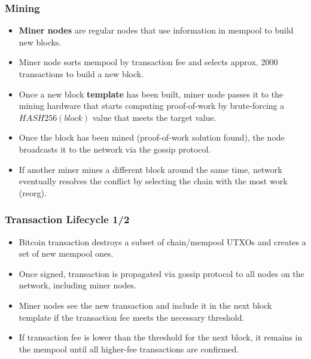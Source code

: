 \documentclass{beamer}
\begin{document}
\begin{frame}
  \frametitle{Mining}
  \begin{itemize}
  \item \textbf{Miner nodes} are regular nodes that use information in mempool
    to build new blocks.
  \item Miner node sorts mempool by transaction fee and selects approx. 2000
    transactions to build a new block.
  \item Once a new block \textbf{template} has been built, miner node passes it
    to the mining hardware that starts computing proof-of-work by brute-forcing
    a $HASH256(block)$ value that meets the target value.
  \item Once the block has been mined (proof-of-work solution found), the node
    broadcasts it to the network via the gossip protocol.
  \item If another miner mines a different block around the same time, network
    eventually resolves the conflict by selecting the chain with the most work
    (reorg).
  \end{itemize}
\end{frame}

\begin{frame}
  \frametitle{Transaction Lifecycle 1/2}
  \begin{itemize}
  \item Bitcoin transaction destroys a subset of chain/mempool UTXOs and creates
    a set of new mempool ones.
  \item Once signed, transaction is propagated via gossip protocol to all nodes
    on the network, including miner nodes.
  \item Miner nodes see the new transaction and include it in the next block
    template if the transaction fee meets the necessary threshold.
  \item If transaction fee is lower than the threshold for the next block, it
    remains in the mempool until all higher-fee transactions are confirmed.
  \end{itemize}
\end{frame}
\end{document}
